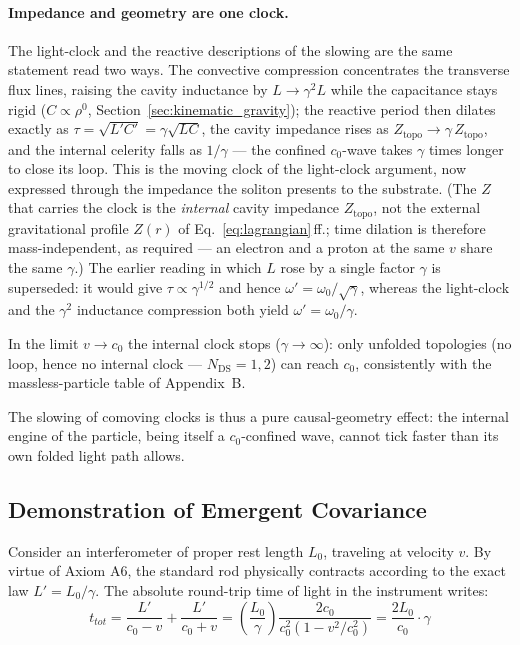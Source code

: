 \documentclass[11pt,a4paper]{article}
\theoremstyle{plain}
\theoremstyle{remark}
\newcommand{\Ncd}{\ensuremath{N_{\mathrm{DS}}}}
\begin{document}
\paragraph{Impedance and geometry are one clock.} The light-clock and the reactive descriptions of the slowing are the same statement read two ways. The convective compression concentrates the transverse flux lines, raising the cavity inductance by $L \to \gamma^2 L$ while the capacitance stays rigid ($C \propto \rho^0$, Section~\ref{sec:kinematic_gravity}); the reactive period then dilates exactly as $\tau = \sqrt{L'C'} = \gamma\sqrt{LC}$, the cavity impedance rises as $Z_{\text{topo}} \to \gamma\,Z_{\text{topo}}$, and the internal celerity falls as $1/\gamma$ --- the confined $c_0$-wave takes $\gamma$ times longer to close its loop. This is the moving clock of the light-clock argument, now expressed through the impedance the soliton presents to the substrate. (The $Z$ that carries the clock is the \emph{internal} cavity impedance $Z_{\text{topo}}$, not the external gravitational profile $Z(r)$ of Eq.~\ref{eq:lagrangian}\,ff.; time dilation is therefore mass-independent, as required --- an electron and a proton at the same $v$ share the same $\gamma$.) The earlier reading in which $L$ rose by a single factor $\gamma$ is superseded: it would give $\tau \propto \gamma^{1/2}$ and hence $\omega' = \omega_0/\sqrt\gamma$, whereas the light-clock and the $\gamma^2$ inductance compression both yield $\omega' = \omega_0/\gamma$.

In the limit $v \to c_0$ the internal clock stops ($\gamma \to \infty$): only unfolded topologies (no loop, hence no internal clock --- $\Ncd = 1,2$) can reach $c_0$, consistently with the massless-particle table of Appendix~B.

The slowing of comoving clocks is thus a pure causal-geometry effect: the internal engine of the particle, being itself a $c_0$-confined wave, cannot tick faster than its own folded light path allows.

\subsection{Demonstration of Emergent Covariance}

Consider an interferometer of proper rest length $L_0$, traveling at velocity $v$. By virtue of Axiom A6, the standard rod physically contracts according to the exact law $L' = L_0/\gamma$. The absolute round-trip time of light in the instrument writes:
\begin{equation}
t_{tot} = \frac{L'}{c_0 - v} + \frac{L'}{c_0 + v} = \left(\frac{L_0}{\gamma}\right) \frac{2c_0}{c_0^2(1 - v^2/c_0^2)} = \frac{2L_0}{c_0} \cdot \gamma
\end{equation}
\end{document}
